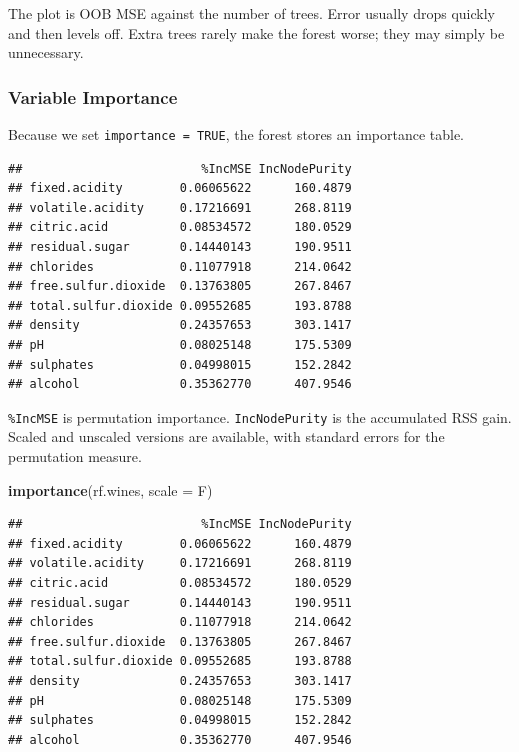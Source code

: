 \documentclass[
]{book}
\newenvironment{Shaded}{\begin{snugshade}}{\end{snugshade}}
\newcommand{\AttributeTok}[1]{\textcolor[rgb]{0.13,0.29,0.53}{#1}}
\newcommand{\FunctionTok}[1]{\textcolor[rgb]{0.13,0.29,0.53}{\textbf{#1}}}
\newcommand{\NormalTok}[1]{#1}
\newcommand{\SpecialCharTok}[1]{\textcolor[rgb]{0.81,0.36,0.00}{\textbf{#1}}}
\begin{document}
The plot is OOB MSE against the number of trees. Error usually drops quickly and then levels off. Extra trees rarely make the forest worse; they may simply be unnecessary.

\subsubsection*{Variable Importance}\label{variable-importance-1}

Because we set \texttt{importance\ =\ TRUE}, the forest stores an importance table.

\begin{Shaded}
\end{Shaded}

\begin{verbatim}
##                         %IncMSE IncNodePurity
## fixed.acidity        0.06065622      160.4879
## volatile.acidity     0.17216691      268.8119
## citric.acid          0.08534572      180.0529
## residual.sugar       0.14440143      190.9511
## chlorides            0.11077918      214.0642
## free.sulfur.dioxide  0.13763805      267.8467
## total.sulfur.dioxide 0.09552685      193.8788
## density              0.24357653      303.1417
## pH                   0.08025148      175.5309
## sulphates            0.04998015      152.2842
## alcohol              0.35362770      407.9546
\end{verbatim}

\texttt{\%IncMSE} is permutation importance. \texttt{IncNodePurity} is the accumulated RSS gain. Scaled and unscaled versions are available, with standard errors for the permutation measure.

\begin{Shaded}
\begin{Highlighting}[]
\FunctionTok{importance}\NormalTok{(rf.wines, }\AttributeTok{scale =}\NormalTok{ F)}
\end{Highlighting}
\end{Shaded}

\begin{verbatim}
##                         %IncMSE IncNodePurity
## fixed.acidity        0.06065622      160.4879
## volatile.acidity     0.17216691      268.8119
## citric.acid          0.08534572      180.0529
## residual.sugar       0.14440143      190.9511
## chlorides            0.11077918      214.0642
## free.sulfur.dioxide  0.13763805      267.8467
## total.sulfur.dioxide 0.09552685      193.8788
## density              0.24357653      303.1417
## pH                   0.08025148      175.5309
## sulphates            0.04998015      152.2842
## alcohol              0.35362770      407.9546
\end{verbatim}
\end{document}
